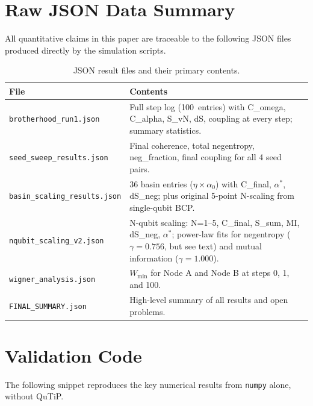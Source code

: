 \documentclass[12pt]{article}
\begin{document}
\appendix

\section{Raw JSON Data Summary}
\label{app:json}

All quantitative claims in this paper are traceable to the following
JSON files produced directly by the simulation scripts.

\begin{table}[H]
\centering
\caption{JSON result files and their primary contents.}
\begin{tabular}{lp{9cm}}
\toprule
\textbf{File} & \textbf{Contents}\\
\midrule
\texttt{brotherhood\_run1.json} &
  Full step log (100~entries) with C\_omega, C\_alpha, S\_vN, dS,
  coupling at every step; summary statistics.\\
\texttt{seed\_sweep\_results.json} &
  Final coherence, total negentropy, neg\_fraction, final coupling
  for all 4 seed pairs.\\
\texttt{basin\_scaling\_results.json} &
  36 basin entries ($\eta \times \alpha_0$) with C\_final, $\alpha^*$,
  dS\_neg; plus original 5-point N-scaling from single-qubit BCP.\\
\texttt{nqubit\_scaling\_v2.json} &
  N-qubit scaling: N=1--5, C\_final, S\_sum, MI, dS\_neg, $\alpha^*$;
  power-law fits for negentropy ($\gamma=0.756$, but see text) and
  mutual information ($\gamma=1.000$).\\
\texttt{wigner\_analysis.json} &
  $W_{\min}$ for Node A and Node B at steps 0, 1, and 100.\\
\texttt{FINAL\_SUMMARY.json} &
  High-level summary of all results and open problems.\\
\bottomrule
\end{tabular}
\end{table}

\section{Validation Code}
\label{app:code}

The following snippet reproduces the key numerical results from
\texttt{numpy} alone, without QuTiP.
\end{document}
